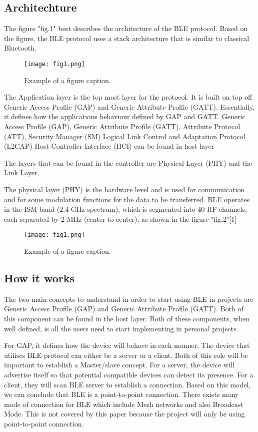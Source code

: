 

\subsection{Architechture}

The figure "fig.1" best describes the architecture of the BLE protocol. Based on the figure, the BLE protocol uses a stack architecture that is similar to classical Bluetooth. 


\begin{figure}[htbp]
\centerline{\texttt{[image: fig1.png]}}
\caption{Example of a figure caption.}
\label{fig1}
\end{figure}

The Application layer is the top most layer for the protocol. It is built on top off Generic Access Profile (GAP) and Generic Attribute Profile (GATT). Essentially, it defines how the applications behaviour defined by GAP and GATT.
Generic Access Profile (GAP), Generic Attribute Profile (GATT), Attribute Protocol (ATT), Security Manager (SM) Logical Link Control and Adaptation Protocol (L2CAP) Host Controller Interface (HCI) can be found in host layer

The layers that can be found in the controller are Physical Layer (PHY) and the Link Layer.

The physical layer (PHY) is the hardware level and is used for communication and for some modulation functions for the data to be transferred. BLE operates in the ISM band (2.4 GHz spectrum), which is segmented into 40 RF channels, each separated by 2 MHz (center-to-center), as shown in the figure "fig.2"[1]

\begin{figure}[htbp]
\centerline{\texttt{[image: fig1.png]}}
\caption{Example of a figure caption.}
\label{fig}
\end{figure}


\subsection{How it works}

The two main concepts to understand in order to start using BLE in projects are Generic Access Profile (GAP) and Generic Attribute Profile (GATT). Both of this component can be found in the host layer. Both of these components, when well defined, is all the users need to start implementing in personal projects.

For GAP, it defines how the device will behave in each manner. The device that utilises BLE protocol can either be a server or a client. Both of this role will be important to establish a Master/slave concept. For a server, the device will advertise itself so that potential compatible devices can detect its presence. For a client, they will scan BLE server to establish a connection. Based on this model, we can conclude that BLE is a point-to-point connection. 
There exists many mode of connection for BLE which include Mesh networks and also Broadcast Mode. This is not covered by this paper because the project will only be using point-to-point connection.

